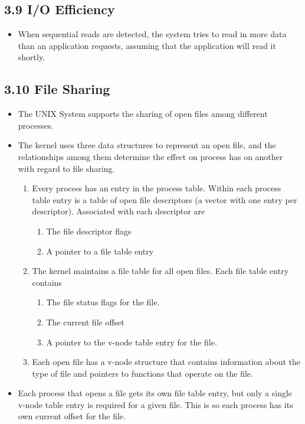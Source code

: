 \documentclass[]{article} \usepackage[all]{xy}
\begin{document}
\subsection*{3.9 I/O Efficiency}
\begin{itemize}
\item When sequential reads are detected, the system tries to read in more data
than an application requests, assuming that the application will read it
shortly.
\end{itemize}

\subsection*{3.10 File Sharing}
\begin{itemize}
\item The UNIX System supports the sharing of open files among different
processes.
\item The kernel uses three data structures to represent an open file, and the
relationships among them determine the effect on process has on another with
regard to file sharing.
\begin{enumerate}
\item Every process has an entry in the process table. Within each process table
entry is a table of open file descriptors (a vector with one entry per
descriptor). Associated with each descriptor are
\begin{enumerate}
\item The file descriptor flags
\item A pointer to a file table entry
\end{enumerate}
\item The kernel maintains a file table for all open files. Each file table
entry contains
\begin{enumerate}
\item The file status flags for the file.
\item The current file offset
\item A pointer to the v-node table entry for the file.
\end{enumerate}
\item Each open file has a v-node structure that contains information about the
type of file and pointers to functions that operate on the file.
\end{enumerate}
\item Each process that opens a file gets its own file table entry, but only a
single v-node table entry is required for a given file. This is so each process
has its own current offset for the file.
\end{itemize}
\end{document}
